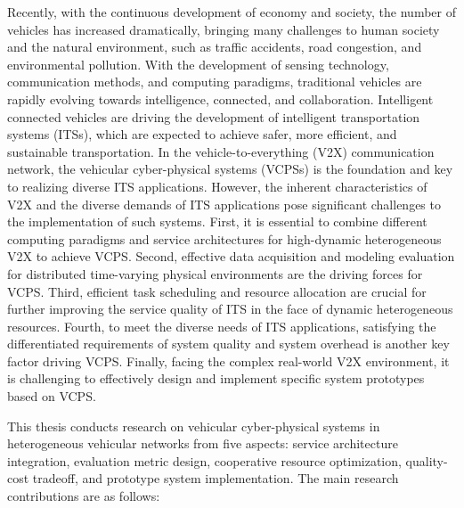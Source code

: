 \begin{eabstract}	%
Recently, with the continuous development of economy and society, the number of vehicles has increased dramatically, bringing many challenges to human society and the natural environment, such as traffic accidents, road congestion, and environmental pollution. 
With the development of sensing technology, communication methods, and computing paradigms, traditional vehicles are rapidly evolving towards intelligence, connected, and collaboration. 
Intelligent connected vehicles are driving the development of intelligent transportation systems (ITSs), which are expected to achieve safer, more efficient, and sustainable transportation.
In the vehicle-to-everything (V2X) communication network, the vehicular cyber-physical systems (VCPSs) is the foundation and key to realizing diverse ITS applications. 
However, the inherent characteristics of V2X and the diverse demands of ITS applications pose significant challenges to the implementation of such systems.
First, it is essential to combine different computing paradigms and service architectures for high-dynamic heterogeneous V2X to achieve VCPS. 
Second, effective data acquisition and modeling evaluation for distributed time-varying physical environments are the driving forces for VCPS. 
Third, efficient task scheduling and resource allocation are crucial for further improving the service quality of ITS in the face of dynamic heterogeneous resources. 
Fourth, to meet the diverse needs of ITS applications, satisfying the differentiated requirements of system quality and system overhead is another key factor driving VCPS. 
Finally, facing the complex real-world V2X environment, it is challenging to effectively design and implement specific system prototypes based on VCPS. 

This thesis conducts research on vehicular cyber-physical systems in heterogeneous vehicular networks from five aspects: service architecture integration, evaluation metric design, cooperative resource optimization, quality-cost tradeoff, and prototype system implementation. 
The main research contributions are as follows:


\end{eabstract}
